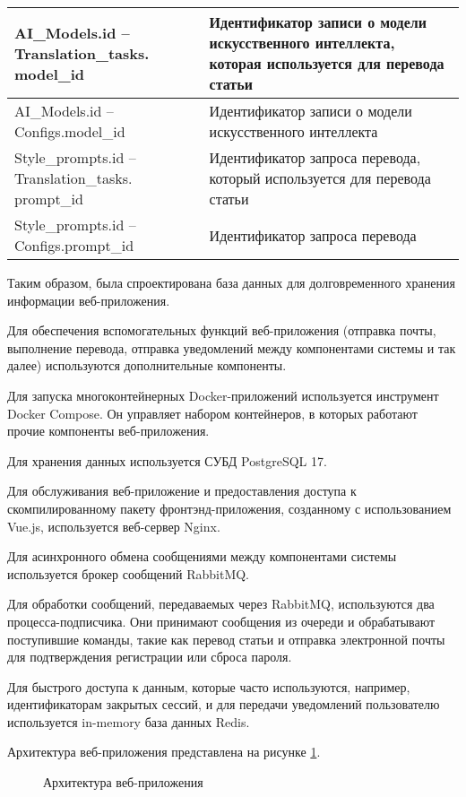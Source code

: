 \begin{longtable}{|p{82mm}|p{83mm}|}
    AI\_Models.id -- Translation\_tasks. model\_id & Идентификатор записи о модели искусственного интеллекта, которая используется для перевода статьи \\ \hline
    AI\_Models.id -- Configs.model\_id & Идентификатор записи о модели искусственного интеллекта \\ \hline
    Style\_prompts.id -- Translation\_tasks. prompt\_id & Идентификатор запроса перевода, который используется для перевода статьи \\ \hline
    Style\_prompts.id -- Configs.prompt\_id & Идентификатор запроса перевода \\ \hline
\end{longtable}

Таким образом, была спроектирована база данных для долговременного хранения информации веб-приложения.


Для обеспечения вспомогательных функций веб-приложения (отправка почты, выполнение перевода, отправка уведомлений между компонентами системы и так далее) используются дополнительные компоненты.

Для запуска многоконтейнерных Docker-приложений используется инструмент Docker Compose. Он управляет набором контейнеров, в которых работают прочие компоненты веб-приложения.

Для хранения данных используется СУБД PostgreSQL 17.

Для обслуживания веб-приложение и предоставления доступа к скомпилированному пакету фронтэнд-приложения, созданному с использованием Vue.js, используется веб-сервер Nginx.

Для асинхронного обмена сообщениями между компонентами системы используется брокер сообщений RabbitMQ.

Для обработки сообщений, передаваемых через RabbitMQ, используются два процесса-подписчика. Они принимают сообщения из очереди и обрабатывают поступившие команды, такие как перевод статьи и отправка электронной почты для подтверждения регистрации или сброса пароля.

Для быстрого доступа к данным, которые часто используются, например, идентификаторам закрытых сессий, и для передачи уведомлений пользователю используется in-memory база данных Redis.

Архитектура веб-приложения представлена на рисунке \ref{img:arch}.

\begin{figure}[H]
    \centering
    \caption{Архитектура веб-приложения \label{img:arch}}
\end{figure}

